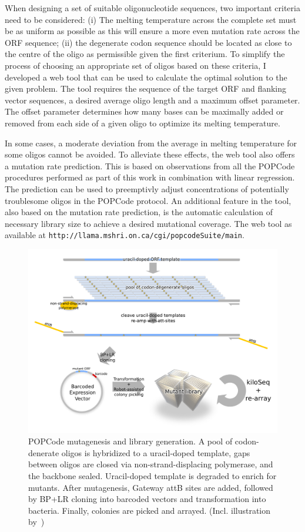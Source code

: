 When designing a set of suitable oligonucleotide sequences, two important criteria need to be considered: 
(i) The melting temperature across the complete set must be as uniform as possible as this will ensure a more even mutation rate across the ORF sequence; (ii) the degenerate codon sequence should be located as close to the centre of the oligo as permissible given the first criterium. To simplify the process of choosing an appropriate set of oligos based on these criteria, I developed a web tool that can be used to calculate the optimal solution to the given problem. The tool requires the sequence of the target ORF and flanking vector sequences, a desired average oligo length and a maximum offset parameter. The offset parameter determines how many bases can be maximally added or removed from each side of a given oligo to optimize its melting temperature. 

In some cases, a moderate deviation from the average in melting temperature for some oligos cannot be avoided. To alleviate these effects, the web tool also offers a mutation rate prediction. This is based on observations from all the POPCode procedures performed as part of this work in combination with linear regression. The prediction can be used to preemptivly adjust concentrations of potentially troublesome oligos in the POPCode protocol. An additional feature in the tool, also based on the mutation rate prediction, is the automatic calculation of necessary library size to achieve a desired mutational coverage. The web tool as available at \verb|http://llama.mshri.on.ca/cgi/popcodeSuite/main|.


\begin{figure}[h!]
	\centering
	\includegraphics[width=\textwidth]{img/popcode_schema.pdf}
	\caption{POPCode mutagenesis and library generation. A pool of codon-denerate oligos is hybridized to a uracil-doped template, gaps between oligos are closed via non-strand-displacing polymerase, and the backbone sealed. Uracil-doped template is degraded to enrich for mutants. After mutagenesis, Gateway attB sites are added, followed by BP+LR cloning into barcoded vectors and transformation into bacteria. Finally, colonies are picked and arrayed. (Incl. illustration by~\cite{pire_stack_2012})}
	\label{fig:popcode_schema}
\end{figure}

